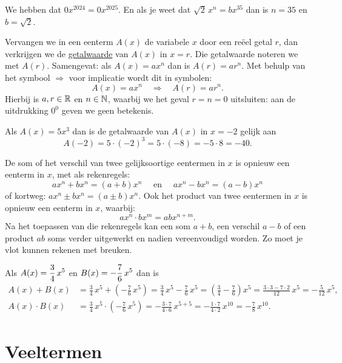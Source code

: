 \documentclass{ximera}
\begin{document}
\begin{example} 
We hebben dat $0x^{2024} = 0x^{2025}$. En als je weet dat $\sqrt{2}\,x^n = bx^{35}$ dan is $n = 35$ en $b = \sqrt{2}$.
\end{example} 



Vervangen we in een eenterm $A(x)$ de variabele $x$ door een re\"eel getal $r$, dan verkrijgen we de \underline{getalwaarde} van $A(x)$ in $x = r$. Die getalwaarde noteren we met $A(r)$. Samengevat: als $A(x) = ax^n$ dan is $A(r) = ar^n$. Met behulp van het symbool $\Rightarrow$ voor implicatie wordt dit in symbolen:
\[
A(x) = ax^n \quad \Rightarrow \quad A(r) = a r^n.
\]
Hierbij is $a,r \in \mathbb{R}$ en $n \in \mathbb{N}$, waarbij we het geval $r = n = 0$ uitsluiten: aan de uitdrukking $0^0$ geven we geen betekenis.

\begin{example} 
Als $A(x) = 5x^3$ dan is de getalwaarde van $A(x)$ in $x = -2$ gelijk aan 
\[
A(-2) = 5 \cdot (-2)^3 = 5 \cdot (-8) = - 5 \cdot 8 = -40.
\]
\end{example} 

De som of het verschil van twee gelijksoortige eentermen in $x$ is opnieuw een eenterm in $x$, met als rekenregels:
\[
ax^n + bx^n = (a+b)x^n \quad \text{ en } \quad ax^n - bx^n = (a-b)x^n
\]
of kortweg: $ax^n \pm bx^n = (a\pm b)x^n$. Ook het product van twee eentermen in $x$ is opnieuw een eenterm in $x$, waarbij:
\[
ax^n \cdot bx^m = abx^{n+m}.
\]
Na het toepassen van die rekenregels kan een som $a+b$, een verschil $a-b$ of een product $ab$ soms verder uitgewerkt en nadien vereenvoudigd worden. Zo moet je vlot kunnen rekenen met breuken.

\begin{example} 
Als $\displaystyle A(x) = \frac{3}{4}\,x^5$ en $\displaystyle B(x) = -\frac{7}{6}\,x^5$ dan is 
\begin{align*}
A(x) + B(x) & = \frac{3}{4}\,x^5 + \left(-\frac{7}{6}\,x^5\right) 
= \frac{3}{4}\,x^5 - \frac{7}{6}\,x^5
= \left(\frac{3}{4} - \frac{7}{6}\right)x^5 
= \frac{3 \cdot 3 - 7 \cdot 2}{12}\,x^5 
= -\frac{5}{12}\,x^5, \\
A(x) \cdot B(x) & = \frac{3}{4}\,x^5 \cdot \left(-\frac{7}{6}\,x^5\right) = - \frac{3 \cdot 7}{4 \cdot 6}\,x^{5+5} = -\frac{1\cdot 7}{4 \cdot 2}\, x^{10} = -\frac{7}{8}\,x^{10}. 
\end{align*}
\end{example} 

\section{Veeltermen}
\end{document}
